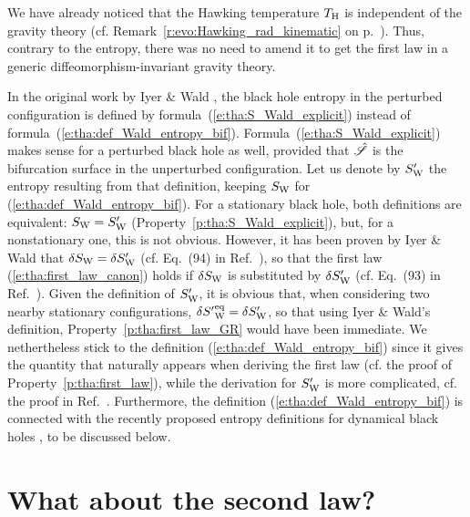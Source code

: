 \begin{remark}
We have already noticed that the Hawking temperature $T_{\rm H}$
is independent of the gravity theory
(cf. Remark~\ref{r:evo:Hawking_rad_kinematic} on p.~\pageref{r:evo:Hawking_rad_kinematic}).
Thus, contrary to the entropy, there was no need to amend it to get the first law
in a generic diffeomorphism-invariant gravity theory.
\end{remark}

\begin{remark}
In the original work by Iyer \& Wald \cite{IyerW94},
the black hole entropy in the perturbed
configuration is defined by formula~(\ref{e:tha:S_Wald_explicit})
instead of formula~(\ref{e:tha:def_Wald_entropy_bif}).
Formula~(\ref{e:tha:S_Wald_explicit}) makes
sense for a perturbed black hole as well, provided that $\hat{\mathscr{S}}$
is the bifurcation surface in the unperturbed configuration.
Let us denote by $S'_{\rm W}$ the entropy resulting from that definition,
keeping $S_{\rm W}$ for (\ref{e:tha:def_Wald_entropy_bif}).
For a stationary black hole, both definitions are equivalent:
$S_{\rm W} = S'_{\rm W}$
(Property~\ref{p:tha:S_Wald_explicit}), but, for a nonstationary one,
this is not obvious. However, it has been proven by Iyer \& Wald that
$\delta S_{\rm W} = \delta S'_{\rm W}$
(cf. Eq.~(94) in Ref.~\cite{IyerW94}), so that the first law
(\ref{e:tha:first_law_canon}) holds if $\delta S_{\rm W}$ is substituted
by $\delta S'_{\rm W}$ (cf. Eq.~(93) in Ref.~\cite{IyerW94}).
Given the definition of $S'_{\rm W}$, it is obvious that, when
considering two nearby stationary configurations,
$\delta {S'}_{\rm W}^{\rm eq} =  \delta S'_{\rm W}$,
so that using Iyer \& Wald's definition, Property~\ref{p:tha:first_law_GR}
would have been immediate. We nethertheless stick to the definition
(\ref{e:tha:def_Wald_entropy_bif}) since it gives the quantity that
naturally appears when deriving the
first law (cf. the proof of Property~\ref{p:tha:first_law}), while the
derivation for $S'_{\rm W}$ is more complicated, cf. the proof in Ref.~\cite{IyerW94}.
Furthermore, the definition (\ref{e:tha:def_Wald_entropy_bif}) is connected
with the recently proposed entropy definitions for dynamical black holes
\cite{HollaWZ24,Wald25,VisseY24}, to be discussed below.
\end{remark}


\section{What about the second law?}


